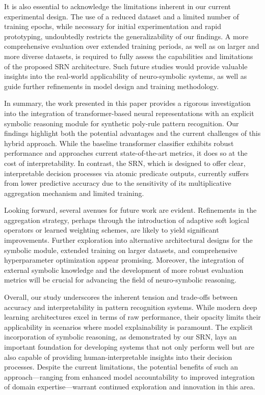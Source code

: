 \documentclass[11pt]{article}
\begin{document}
It is also essential to acknowledge the limitations inherent in our current experimental design. The use of a reduced dataset and a limited number of training epochs, while necessary for initial experimentation and rapid prototyping, undoubtedly restricts the generalizability of our findings. A more comprehensive evaluation over extended training periods, as well as on larger and more diverse datasets, is required to fully assess the capabilities and limitations of the proposed SRN architecture. Such future studies would provide valuable insights into the real-world applicability of neuro-symbolic systems, as well as guide further refinements in model design and training methodology.

In summary, the work presented in this paper provides a rigorous investigation into the integration of transformer-based neural representations with an explicit symbolic reasoning module for synthetic poly‐rule pattern recognition. Our findings highlight both the potential advantages and the current challenges of this hybrid approach. While the baseline transformer classifier exhibits robust performance and approaches current state-of-the-art metrics, it does so at the cost of interpretability. In contrast, the SRN, which is designed to offer clear, interpretable decision processes via atomic predicate outputs, currently suffers from lower predictive accuracy due to the sensitivity of its multiplicative aggregation mechanism and limited training.

Looking forward, several avenues for future work are evident. Refinements in the aggregation strategy, perhaps through the introduction of adaptive soft logical operators or learned weighting schemes, are likely to yield significant improvements. Further exploration into alternative architectural designs for the symbolic module, extended training on larger datasets, and comprehensive hyperparameter optimization appear promising. Moreover, the integration of external symbolic knowledge and the development of more robust evaluation metrics will be crucial for advancing the field of neuro-symbolic reasoning.

Overall, our study underscores the inherent tension and trade-offs between accuracy and interpretability in pattern recognition systems. While modern deep learning architectures excel in terms of raw performance, their opacity limits their applicability in scenarios where model explainability is paramount. The explicit incorporation of symbolic reasoning, as demonstrated by our SRN, lays an important foundation for developing systems that not only perform well but are also capable of providing human-interpretable insights into their decision processes. Despite the current limitations, the potential benefits of such an approach—ranging from enhanced model accountability to improved integration of domain expertise—warrant continued exploration and innovation in this area.
\end{document}
